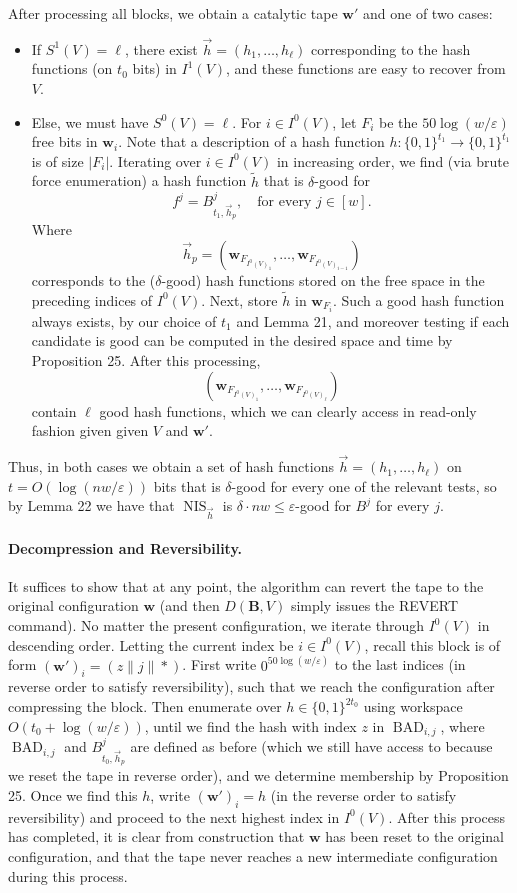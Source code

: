 After processing all blocks, we obtain a catalytic tape $\mathbf w'$ and one of two cases:
\begin{itemize}
\item If $S^1(V)=\ell$, there exist $\vec h=(h_1,\ldots,h_\ell)$ corresponding to the hash functions (on $t_0$ bits) in $I^1(V)$, and these functions are easy to recover from $V$.
\item Else, we must have $S^0(V)=\ell$. For $i\in I^0(V)$, let $F_i$ be the $50\log(w/\varepsilon)$ free bits in $\mathbf w_i$. Note that a description of a hash function $h:\{0,1\}^{t_1}\to\{0,1\}^{t_1}$ is of size $|F_i|$. Iterating over $i\in I^0(V)$ in increasing order, we find (via brute force enumeration) a hash function $\widetilde h$ that is $\delta$-good for
\[f^j=B^j_{t_1,\vec h_p},\quad\text{for every }j\in[w].\]
Where
\[\vec h_p=(\mathbf w_{F_{I^0(V)_1}},\ldots,\mathbf w_{F_{I^0(V)_{i-1}}})\]
corresponds to the ($\delta$-good) hash functions stored on the free space in the preceding indices of $I^0(V)$. Next, store $\widetilde h$ in $\mathbf w_{F_i}$. Such a good hash function always exists, by our choice of $t_1$ and Lemma 21, and moreover testing if each candidate is good can be computed in the desired space and time by Proposition 25. After this processing,
\[(\mathbf w_{F_{I^0(V)_1}},\ldots,\mathbf w_{F_{I^0(V)_\ell}})\]
contain $\ell$ good hash functions, which we can clearly access in read-only fashion given given $V$ and $\mathbf w'$.
\end{itemize}
Thus, in both cases we obtain a set of hash functions $\vec h=(h_1,\ldots,h_\ell)$ on $t=O(\log(nw/\varepsilon))$ bits that is $\delta$-good for every one of the relevant tests, so by Lemma 22 we have that $\operatorname{NIS}_{\vec h}$ is $\delta\cdot nw\leq\varepsilon$-good for $B^j$ for every $j$.
\paragraph{Decompression and Reversibility.} It suffices to show that at any point, the algorithm can revert the tape to the original configuration $\mathbf w$ (and then $D(\mathbf B,V)$ simply issues the REVERT command). No matter the present configuration, we iterate through $I^0(V)$ in descending order. Letting the current index be $i\in I^0(V)$, recall this block is of form $(\mathbf w')_i=(z\|j\|*)$. First write $0^{50\log(w/\varepsilon)}$ to the last indices (in reverse order to satisfy reversibility), such that we reach the configuration after compressing the block. Then enumerate over $h\in\{0,1\}^{2t_0}$ using workspace $O(t_0+\log(w/\varepsilon))$, until we find the hash with index $z$ in $\operatorname{BAD}_{i,j}$, where $\operatorname{BAD}_{i,j}$ and $B^j_{t_0,\vec h_p}$ are defined as before (which we still have access to because we reset the tape in reverse order), and we determine membership by Proposition 25.
Once we find this $h$, write $(\mathbf w')_i=h$ (in the reverse order to satisfy reversibility) and proceed to the next highest index in $I^0(V)$. After this process has completed, it is clear from construction that $\mathbf w$ has been reset to the original configuration, and that the tape never reaches a new intermediate configuration during this process.
